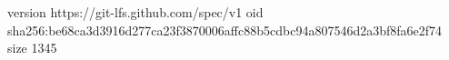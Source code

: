 version https://git-lfs.github.com/spec/v1
oid sha256:be68ca3d3916d277ca23f3870006affc88b5cdbc94a807546d2a3bf8fa6e2f74
size 1345
